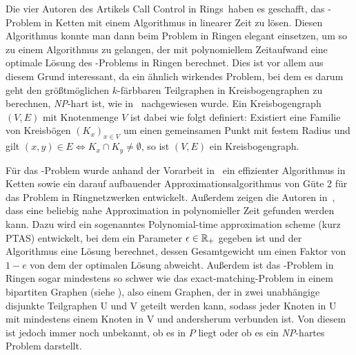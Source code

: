 Die vier Autoren des Artikels \glqq Call Control in Rings\grqq\ haben es geschafft, das \CallControl-Problem in Ketten mit
einem Algorithmus in linearer Zeit zu lösen.
Diesen Algorithmus konnte man dann beim Problem in Ringen elegant einsetzen, um so zu einem Algorithmus zu gelangen, der mit polynomiellem Zeitaufwand
eine optimale Lösung des \CallControl-Problems in Ringen berechnet.
Dies ist vor allem aus diesem Grund interessant, da ein ähnlich wirkendes Problem, bei dem es darum geht den größtmöglichen $k$-färbbaren 
Teilgraphen in Kreisbogengraphen zu berechnen, {\em NP}-hart ist, wie in~\cite{circular-arc} nachgewiesen wurde.
Ein Kreisbogengraph $(V,E)$ mit Knotenmenge $V$ ist dabei wie folgt definiert: 
Existiert eine Familie von Kreisbögen $(K_x)_{x\in V}$ um einen gemeinsamen Punkt mit festem Radius 
und gilt $(x,y)\in E \Leftrightarrow K_x \cap K_y \neq \emptyset$, so ist $(V,E)$ ein Kreisbogengraph.

Für das \WeightedCallControl-Problem wurde anhand der Vorarbeit in~\cite{carlisle} ein effizienter Algorithmus in Ketten sowie ein darauf
aufbauender Approximationsalgorithmus von Güte 2 für das Problem in Ringnetzwerken entwickelt.
Außerdem zeigen die Autoren in~\cite{paper}, dass eine beliebig nahe Approximation in polynomieller Zeit gefunden werden kann.
Dazu wird ein sogenanntes Polynomial-time approximation scheme (kurz PTAS) entwickelt, bei dem ein Parameter $\epsilon \in \mathbb R_+$ gegeben ist
und der Algorithmus eine Lösung berechnet, dessen Gesamtgewicht um einen Faktor von $1-e$ von dem der optimalen Lösung abweicht.
Außerdem ist das \WeightedCallControl-Problem in Ringen sogar mindestens so schwer wie das exact-matching-Problem in einem bipartiten Graphen (siehe \cite{hochbaum-levin}),
also einem Graphen, der in zwei unabhängige disjunkte Teilgraphen U und V geteilt werden kann, sodass jeder Knoten in U mit mindestens einem Knoten in V und andersherum verbunden ist.
Von diesem ist jedoch immer noch unbekannt, ob es in $P$ liegt oder ob es ein {\em NP}-hartes Problem darstellt.